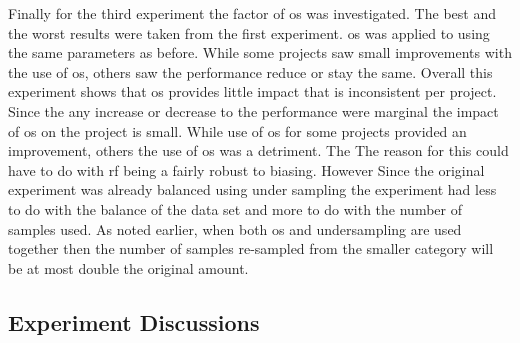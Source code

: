 Finally for the third experiment the factor of \gls{os} was investigated. The best and the worst results were taken from the first experiment. \gls{os} was applied to using the same parameters as before. While some projects saw small improvements with the use of \gls{os}, others saw the performance reduce or stay the same. Overall this experiment shows that \gls{os} provides little impact that is inconsistent per project. Since the any increase or decrease to the performance were marginal the impact of \gls{os} on the project is small. While use of \gls{os} for some projects provided an improvement, others the use of \gls{os} was a detriment. The The reason for this could have to do with \gls{rf} being a fairly robust to biasing. However Since the original experiment was already balanced using under sampling the experiment had less to do with the balance of the data set and more to do with the number of samples used. As noted earlier, when both \gls{os} and undersampling are used together then the number of samples re-sampled from the smaller category will be at most double the original amount.

\subsection{Experiment Discussions}


